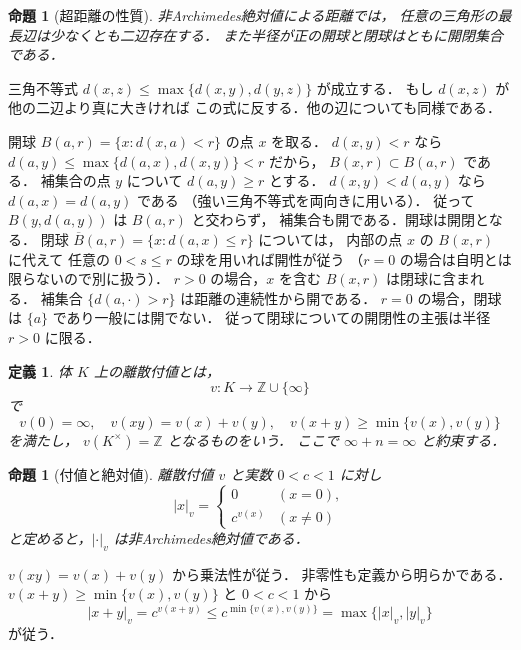 \documentclass[a5paper,10pt,onecolumn]{jsarticle}
\makeatletter
\theoremstyle{mathnotetheorem}
\newtheorem{definition}[theorem]{定義}
\newtheorem{proposition}[theorem]{命題}
\renewcommand{\proofname}{証明}
\renewenvironment{proof}[1][\proofname]{%
  \par\pushQED{\qed}\normalfont\topsep4\p@\@plus2\p@\relax
  \trivlist\item[\hskip\labelsep\bfseries #1]\ignorespaces
}{\popQED\endtrivlist\@endpefalse}
\makeatother
\begin{document}
\begin{proposition}[超距離の性質]\label{prop:ultrametric}
非Archimedes絶対値による距離では，
任意の三角形の最長辺は少なくとも二辺存在する．
また半径が正の開球と閉球はともに開閉集合である．
\end{proposition}
\begin{proof}
三角不等式
$d(x,z)\le\max\{d(x,y),d(y,z)\}$ が成立する．
もし $d(x,z)$ が他の二辺より真に大きければ
この式に反する．他の辺についても同様である．

開球 $B(a,r)=\{x:d(x,a)<r\}$ の点 $x$ を取る．
$d(x,y)<r$ なら
$d(a,y)\le\max\{d(a,x),d(x,y)\}<r$ だから，
$B(x,r)\subset B(a,r)$ である．
補集合の点 $y$ について
$d(a,y)\ge r$ とする．
$d(x,y)<d(a,y)$ なら
$d(a,x)=d(a,y)$ である
（強い三角不等式を両向きに用いる）．
従って $B(y,d(a,y))$ は $B(a,r)$ と交わらず，
補集合も開である．開球は開閉となる．
閉球 $\overline B(a,r)=\{x:d(a,x)\le r\}$ については，
内部の点 $x$ の $B(x,r)$ に代えて
任意の $0<s\le r$ の球を用いれば開性が従う
（$r=0$ の場合は自明とは限らないので別に扱う）．
$r>0$ の場合，$x$ を含む $B(x,r)$ は閉球に含まれる．
補集合 $\{d(a,\cdot)>r\}$ は距離の連続性から開である．
$r=0$ の場合，閉球は $\{a\}$ であり一般には開でない．
従って閉球についての開閉性の主張は半径 $r>0$ に限る．
\end{proof}

\begin{definition}
体 $K$ 上の\emph{離散付値}とは，
\[
 v:K\longrightarrow\mathbb Z\cup\{\infty\}
\]
で
\[
 v(0)=\infty,\quad v(xy)=v(x)+v(y),\quad
 v(x+y)\ge\min\{v(x),v(y)\}
\]
を満たし，
$v(K^\times)=\mathbb Z$ となるものをいう．
ここで $\infty+n=\infty$ と約束する．
\end{definition}

\begin{proposition}[付値と絶対値]\label{prop:valuation-abs}
離散付値 $v$ と実数 $0<c<1$ に対し
\[
 |x|_v=
 \begin{cases}0&(x=0),\\ c^{v(x)}&(x\ne0)\end{cases}
\]
と定めると，$|\cdot|_v$ は非Archimedes絶対値である．
\end{proposition}
\begin{proof}
$v(xy)=v(x)+v(y)$ から乗法性が従う．
非零性も定義から明らかである．
$v(x+y)\ge\min\{v(x),v(y)\}$ と $0<c<1$ から
\[
 |x+y|_v=c^{v(x+y)}
 \le c^{\min\{v(x),v(y)\}}
 =\max\{|x|_v,|y|_v\}
\]
が従う．
\end{proof}
\end{document}
